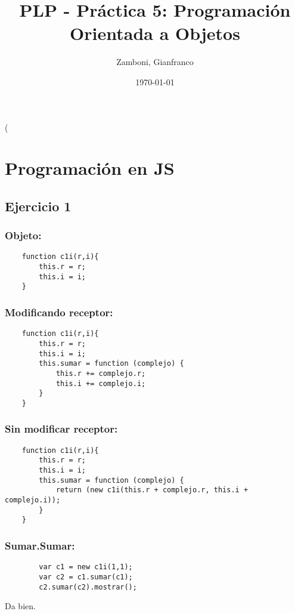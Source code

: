 \left( \documentclass[10pt,a4paper]{article}
\begin{document}
\title{PLP - Práctica 5: Programación Orientada a Objetos}

\date{\today}

\author{Zamboni, Gianfranco}

\maketitle
\setcounter{page}{1}

\section*{\centering Programación en JS}
\subsection{Ejercicio 1}
\subsubsection{Objeto:}
    \begin{lstlisting}
    function c1i(r,i){
    	this.r = r;
    	this.i = i;
    }
    \end{lstlisting}
\subsubsection{Modificando receptor:}
    \begin{lstlisting}
    function c1i(r,i){
    	this.r = r;
    	this.i = i;
    	this.sumar = function (complejo) {
    		this.r += complejo.r;
    		this.i += complejo.i;
    	}
    }
    \end{lstlisting}
\subsubsection{Sin modificar receptor:}
    \begin{lstlisting}
    function c1i(r,i){
    	this.r = r;
    	this.i = i;
    	this.sumar = function (complejo) {
            return (new c1i(this.r + complejo.r, this.i + complejo.i));
    	}
    }
    \end{lstlisting}
\subsubsection{Sumar.Sumar:}
    \begin{lstlisting}
        var c1 = new c1i(1,1);
        var c2 = c1.sumar(c1);
        c2.sumar(c2).mostrar();
    \end{lstlisting}
    Da bien.
\end{document}
